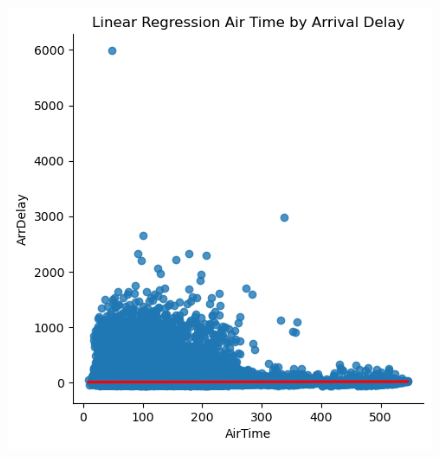 \documentclass[a4paper,11pt]{article}
\begin{document}
\begin{figure}
    \centering
    \includegraphics*[scale=.40]{../../img/airtime_by_delay.png}
    \caption[]{}
    \label{fig:lm_airtimebydelay}
\end{figure}
\end{document}

